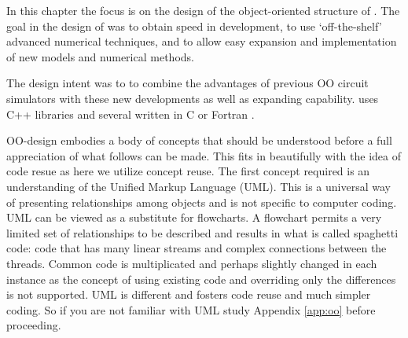 In this chapter the focus is on the design of the object-oriented
structure of \FDA. The goal in the design of \FDA was to obtain speed in
development, to use `off-the-shelf' advanced numerical techniques, and
to allow easy expansion and implementation of new models and numerical
methods.

The design intent was to to combine the advantages of previous OO circuit
simulators with these new developments as well as expanding
capability. \FDA uses C++ libraries \cite{adol-c:96,mv++} and
several written in C or Fortran \cite{FFTW,Sparse,NNES}.

OO-design embodies a body of concepts that should be understood before
a full appreciation of what follows can be made.
This fits in beautifully with the idea of code resue as here we utilize concept reuse.
The first concept required is an understanding of the Unified Markup Language (UML).
This is a universal way of presenting relationships among objects and is not specific to computer coding.
UML can be viewed as a substitute for flowcharts.
A flowchart permits a very limited set of relationships to be described
and results in what is called spaghetti code: code that has many linear streams and complex connections between the threads.
Common code is multiplicated and perhaps slightly changed in each instance
as the concept of using existing code and overriding only the differences is not supported.
UML is different and fosters code reuse and much simpler coding.
So if you are not familiar with UML study Appendix \ref{app:oo}
before proceeding.

